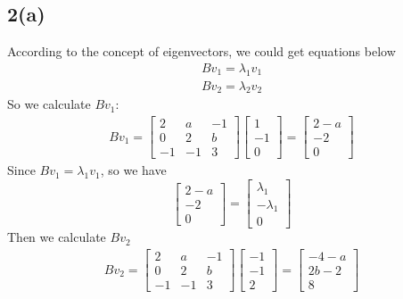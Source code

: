 \documentclass{article}
\begin{document}
\subsection*{2(a)}
According to the concept of eigenvectors, we could get equations below
$$
\begin{aligned}
    B v_1 = \lambda_1 v_1 \\
    B v_2 = \lambda_2 v_2 
\end{aligned}
$$
So we calculate $B v_1$:
$$
\begin{aligned}
    B v_1 = 
    \begin{bmatrix}
        2 & a & -1 \\
        0 & 2 & b \\
        -1 & -1 & 3
    \end{bmatrix}
    \begin{bmatrix}
        1 \\ -1 \\ 0
    \end{bmatrix} =
    \begin{bmatrix}
        2 - a \\ -2 \\ 0
    \end{bmatrix}
\end{aligned}
$$
Since $B v_1 = \lambda_1 v_1 $, so we have
$$
\begin{bmatrix}
    2 - a \\ -2 \\ 0
\end{bmatrix} = 
\begin{bmatrix}
    \lambda_1 \\ -\lambda_1 \\ 0
\end{bmatrix}
$$
Then we calculate $B v_2$
$$
\begin{aligned}
    B v_2 = 
    \begin{bmatrix}
        2 & a & -1 \\
        0 & 2 & b \\
        -1 & -1 & 3
    \end{bmatrix}
    \begin{bmatrix}
        -1 \\ -1 \\ 2
    \end{bmatrix} =
    \begin{bmatrix}
        -4 - a \\ 2b - 2 \\ 8
    \end{bmatrix}
\end{aligned}
$$
\end{document}
